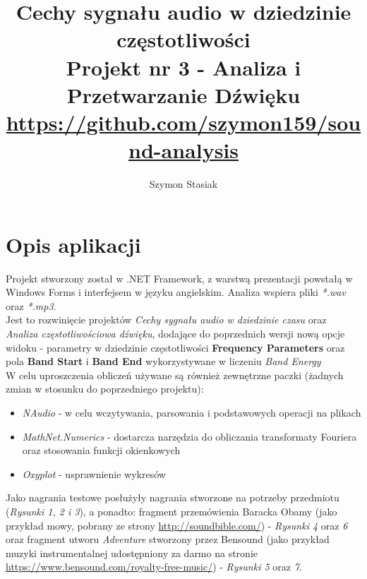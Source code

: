 \documentclass[a4paper]{article}
\title{Cechy sygnału audio w dziedzinie częstotliwości\\
\large Projekt nr 3 - Analiza i Przetwarzanie Dźwięku\\ 
\small \url{https://github.com/szymon159/sound-analysis}}
\date{}
\author{Szymon Stasiak}
\begin{document}
  \maketitle

\section{Opis aplikacji}
Projekt stworzony został w .NET Framework, z warstwą prezentacji powstałą w Windows Forms i interfejsem w języku angielskim. Analiza wspiera pliki \textit{*.wav} oraz \textit{*.mp3}.\\
Jest to rozwinięcie projektów \textit{Cechy sygnału audio w dziedzinie czasu} oraz \textit{Analiza częstotliwościowa dźwięku}, dodające do poprzednich wersji nową opcje widoku - parametry w dziedzinie częstotliwości \textbf{Frequency Parameters} oraz pola \textbf{Band Start} i \textbf{Band End} wykorzystywane w liczeniu \textit{Band Energy}\\
W celu uproszczenia obliczeń używane są również zewnętrzne paczki (żadnych zmian w stosunku do poprzedniego projektu):
\begin{itemize}
\item \textit{NAudio} - w celu wczytywania, parsowania i podstawowych operacji na plikach
\item \textit{MathNet.Numerics} - dostarcza narzędzia do obliczania transformaty Fouriera oraz stosowania funkcji okienkowych
\item \textit{Oxyplot} - usprawnienie wykresów
\end{itemize}
Jako nagrania testowe posłużyły nagrania stworzone na potrzeby przedmiotu (\textit{Rysunki 1, 2 i 3}), a ponadto: fragment przemówienia Baracka Obamy (jako przykład mowy, pobrany ze strony \url{http://soundbible.com/}) - \textit{Rysunki 4} oraz \textit{6} oraz fragment utworu \textit{Adventure} stworzony przez Bensound (jako przykład muzyki instrumentalnej udostępniony za darmo na stronie \url{https://www.bensound.com/royalty-free-music/}) - \textit{Rysunki 5} oraz \textit{7}.
\end{document}
